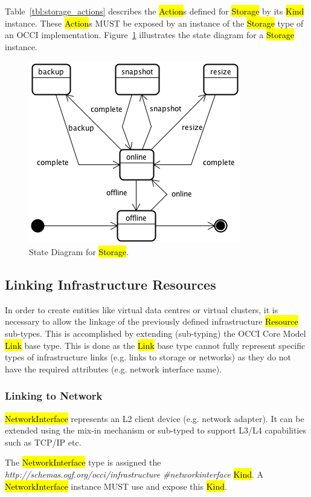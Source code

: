 \documentclass[10pt,a4paper]{article}
\begin{document}
Table~\ref{tbl:storage_actions} describes the \hl{Action}s defined for
\hl{Storage} by its \hl{Kind} instance. These \hl{Action}s MUST be exposed 
by an instance of the \hl{Storage} type of an OCCI implementation. 
Figure~\ref{fig:storage_state} illustrates the state diagram for a \hl{Storage} instance.

\begin{figure}[!h]
	\centering
	\includegraphics[scale=0.4]{figs/storage-state.png}
	\caption{State Diagram for \hl{Storage}.}
	\label{fig:storage_state}
\end{figure}

\subsection{Linking Infrastructure Resources}
In order to create entities like virtual data centres or virtual clusters, it is necessary to allow the linkage
of the previously defined infrastructure \hl{Resource} sub-types. This is accomplished by extending 
(sub-typing) the OCCI Core Model \hl{Link} base type. This is done as the \hl{Link} base type cannot 
fully represent specific types of infrastructure links (e.g. links to storage or networks) as they do not 
have the required attributes (e.g. network interface name).

\subsubsection{Linking to Network}
\hl{NetworkInterface} represents an L2 client device (e.g. network adapter). It can be extended using the mix-in mechanism or sub-typed to support L3/L4 capabilities such as TCP/IP etc. 

The \hl{NetworkInterface} type is assigned the \textit{http://schemas.ogf.org/occi/infrastructure
\#networkinterface} \hl{Kind}. A \hl{NetworkInterface} instance MUST use and expose this \hl{Kind}. 
\end{document}
